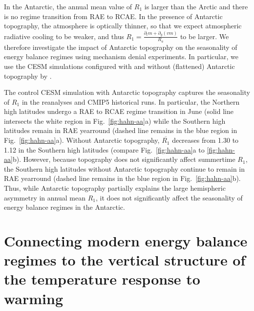 \documentclass{ametsocV5}
\begin{document}

  In the Antarctic, the annual mean value of $R_1$ is larger than the Arctic and there is no regime transition from RAE to RCAE. In the presence of Antarctic topography, the atmosphere is optically thinner, so that we expect atmospheric radiative cooling to be weaker, and thus $R_1=\frac{\partial_t m + \partial_y (vm)}{R_a}$ to be larger. We therefore investigate the impact of Antarctic topography on the seasonality of energy balance regimes using mechanism denial experiments. In particular, we use the CESM simulations configured with and without (flattened) Antarctic topography by \cite{hahn2020}.

  The control CESM simulation with Antarctic topography captures the seasonality of $R_1$ in the reanalyses and CMIP5 historical runs. In particular, the Northern high latitudes undergo a RAE to RCAE regime transition in June (solid line intersects the white region in Fig.~\ref{fig:hahn-aa}a) while the Southern high latitudes remain in RAE yearround (dashed line remains in the blue region in Fig.~\ref{fig:hahn-aa}a). Without Antarctic topography, $\overline{R_1}$ decreases from 1.30 to 1.12 in the Southern high latitudes (compare Fig.~\ref{fig:hahn-aa}a to \ref{fig:hahn-aa}b). However, because topography does not significantly affect summertime $R_1$, the Southern high latitudes without Antarctic topography continue to remain in RAE yearround (dashed line remains in the blue region in Fig.~\ref{fig:hahn-aa}b). Thus, while Antarctic topography partially explains the large hemispheric asymmetry in annual mean $R_1$, it does not significantly affect the seasonality of energy balance regimes in the Antarctic.

\section{Connecting modern energy balance regimes to the vertical structure of the temperature response to warming} \label{sec:vtemp}
\end{document}
